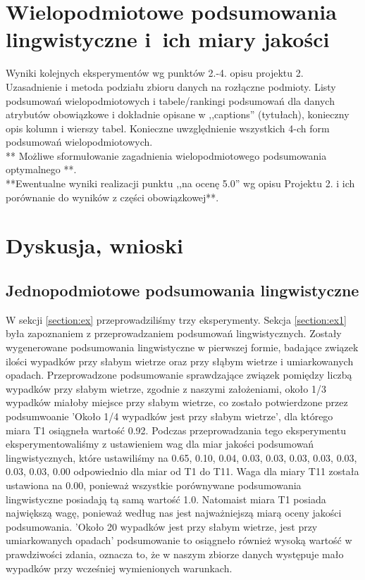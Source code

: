 \documentclass{classrep}
\begin{document}
\section{Wielopodmiotowe podsumowania lingwistyczne i~ich miary jakości} 
Wyniki kolejnych eksperymentów wg punktów 2.-4. opisu projektu 2. Uzasadnienie i
metoda podziału zbioru danych na rozłączne podmioty. Listy podsumowań
wielopodmiotowych i tabele/rankingi podsumowań dla danych atrybutów obowiązkowe i
dokładnie opisane w ,,captions'' (tytułach), konieczny opis kolumn i wierszy tabel.
Konieczne uwzględnienie wszystkich 4-ch form podsumowań wielopodmiotowych. 
\\ 

** Możliwe sformułowanie zagadnienia wielopodmiotowego podsumowania optymalnego **.\\

{**Ewentualne wyniki realizacji punktu ,,na ocenę 5.0'' wg opisu Projektu 2. i ich porównanie do wyników z
części obowiązkowej**.}\\


\section{Dyskusja, wnioski}
\subsection{Jednopodmiotowe podsumowania lingwistyczne}

W sekcji \ref{section:ex} przeprowadziliśmy trzy eksperymenty. Sekcja \ref{section:ex1} była zapoznaniem z przeprowadzaniem podsumowań lingwistycznych. Zostały wygenerowane podsumowania lingwistyczne w pierwszej formie, badające związek ilości wypadków przy słabym wietrze oraz przy słąbym wietrze i umiarkowanych opadach. Przeprowadzone podsumowanie sprawdzające związek pomiędzy liczbą wypadków przy słabym wietrze, zgodnie z naszymi założeniami, około 1/3 wypadków miałoby miejsce przy słabym wietrze, co zostało potwierdzone przez podsumwoanie 'Około 1/4 wypadków jest przy słabym wietrze', dla którego miara T1 osiągneła wartość 0.92. Podczas przeprowadzania tego eksperymentu eksperymentowaliśmy z ustawieniem wag dla miar jakości podsumowań lingwistycznych, które ustawiliśmy na 0.65, 0.10, 0.04, 0.03, 0.03, 0.03, 0.03, 0.03, 0.03, 0.03, 0.00 odpowiednio dla miar od T1 do T11. Waga dla miary T11 została ustawiona na 0.00, ponieważ wszystkie porównywane podsumowania lingwistyczne posiadają tą samą wartość 1.0. Natomaist miara T1 posiada największą wagę, ponieważ według nas jest najważniejszą miarą oceny jakości podsumowania. 'Około 20 wypadków jest przy słabym wietrze, jest przy umiarkowanych opadach' podsumowanie to osiągneło również wysoką wartość w prawdziwości zdania, oznacza to, że w naszym zbiorze danych występuje mało wypadków przy wcześniej wymienionych warunkach. \\
\end{document}
